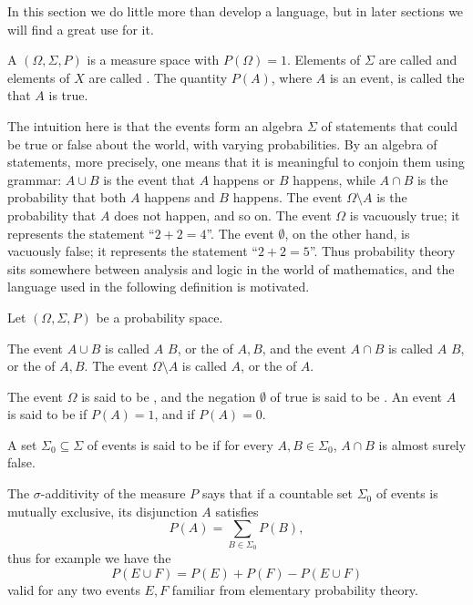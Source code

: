 In this section we do little more than develop a language, but in later sections we will find a great use for it.

\begin{definition}
A  $(\Omega, \Sigma, P)$ is a measure space with $P(\Omega) = 1$.
Elements of $\Sigma$ are called  and elements of $X$ are called .
The quantity $P(A)$, where $A$ is an event, is called the  that $A$ is true.
\end{definition}

\begin{subsec}
The intuition here is that the events form an algebra $\Sigma$ of statements that could be true or false about the world, with varying probabilities.
By an algebra of statements, more precisely, one means that it is meaningful to conjoin them using grammar: $A \cup B$ is the event that $A$ happens or $B$ happens, while $A \cap B$ is the probability that both $A$ happens and $B$ happens. The event $\Omega \setminus A$ is the probability that $A$ does not happen, and so on.
The event $\Omega$ is vacuously true; it represents the statement ``$2 + 2 = 4$''.
The event $\emptyset$, on the other hand, is vacuously false; it represents the statement ``$2 + 2 = 5$''.
Thus probability theory sits somewhere between analysis and logic in the world of mathematics, and the language used in the following definition is motivated.
\end{subsec}

\begin{definition}
Let $(\Omega, \Sigma, P)$ be a probability space.

The event $A \cup B$ is called $A$  $B$, or the  of $A,B$, and the event $A \cap B$ is called $A$  $B$, or the  of $A,B$.
The event $\Omega \setminus A$ is called  $A$, or the  of $A$.

The event $\Omega$ is said to be , and the negation $\emptyset$ of true is said to be .
An event $A$ is said to be  if $P(A) = 1$, and  if $P(A) = 0$.

A set $\Sigma_{0} \subseteq \Sigma$ of events is said to be  if for every $A, B \in \Sigma_{0}$, $A \cap B$ is almost surely false.
\end{definition}

\begin{subsec}
The $\sigma$-additivity of the measure $P$ says that if a countable set $\Sigma_{0}$ of events is mutually exclusive, its disjunction $A$ satisfies
\[P(A) = \sum_{B \in \Sigma_{0}} P(B),\]
thus for example we have the 
\[P(E \cup F) = P(E) + P(F) - P(E \cup F)\]
valid for any two events $E,F$ familiar from elementary probability theory.
\end{subsec}

